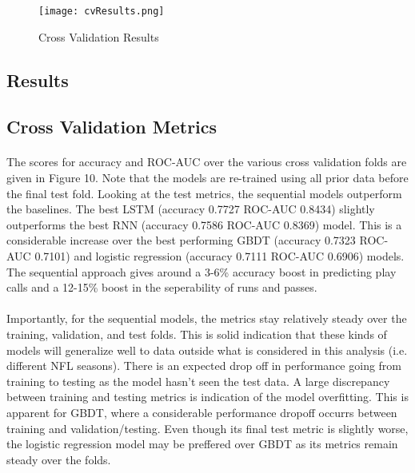 \documentclass[11pt]{article}
\begin{document}
    \begin{figure}[ht]
        \texttt{[image: cvResults.png]}
        \caption{Cross Validation Results}
        \label{fig:CV Results}
    \end{figure}
    \begin{multicols*}{2}           
    

                
    \section{Results}

        \subsection{Cross Validation Metrics}

            \paragraph{}
                The scores for accuracy and ROC-AUC over the various cross validation folds are given in Figure 10.
                Note that the models are re-trained using all prior data before the final test fold.
                Looking at the test metrics, the sequential models outperform the baselines.
                The best LSTM (accuracy 0.7727 ROC-AUC 0.8434) slightly outperforms the best RNN (accuracy 0.7586 ROC-AUC 0.8369) model.  
                This is a considerable increase over the best performing GBDT (accuracy 0.7323 ROC-AUC 0.7101) and logistic regression (accuracy 0.7111 ROC-AUC 0.6906) models. 
                The sequential approach gives around a 3-6\% accuracy boost in predicting play calls and a 12-15\% boost in the seperability of runs and passes.
                
            \vspace{-10pt}

            \paragraph{}
                Importantly, for the sequential models, the metrics stay relatively steady over the training, validation, and test folds.
                This is solid indication that these kinds of models will generalize well to data outside what is considered in this analysis (i.e. different NFL seasons).  
                There is an expected drop off in performance going from training to testing as the model hasn't seen the test data. 
                A large discrepancy between training and testing metrics is indication of the model overfitting.
                This is apparent for GBDT, where a considerable performance dropoff occurrs between training and validation/testing.
                Even though its final test metric is slightly worse, the logistic regression model may be preffered over GBDT as its metrics remain steady over the folds. 
                 

\end{multicols*}
\end{document}
